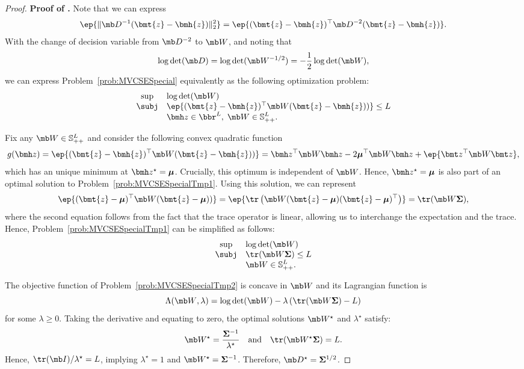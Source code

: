 \documentclass[mnsc, nonblindrev]{informswp}
\newcommand{\1}[1]{\mathds{1}{\left(#1\right)}}
\begin{document}
\begin{appendices}
\begin{proof}{\bf Proof of .}
Note that we can express 
$$
\ep{\|\mb D^{-1}(\bmt{z} - \bmh{z})\|^2_2} = \ep{(\bmt{z} - \bmh{z})^\top{\mb D}^{-2}(\bmt{z} - \bmh{z})}.
$$
With the change of decision variable from $\mb D^{-2}$ to ${\mb W}$, and noting that 
$$
\log \det(\mb D) = \log \det({\mb W^{-1/2}}) = -\frac{1}{2} \log \det(\mb W),
$$ 
we can express Problem~\eqref{prob:MVCSESpecial} equivalently as the following optimization problem:
\begin{equation}
\label{prob:MVCSESpecialTmp1}
\begin{array}{cll}
\sup & \log\det({\mb W}) \\
\subj & \ep{(\bmt{z} - \bmh{z})^\top{\mb W} (\bmt{z} - \bmh{z}))} \leq L \\
& \bmh z \in \bbr^L, \; \displaystyle{\mb W} \in \mathbb{S}^L_{++}.
\end{array}  
\end{equation}

Fix any ${\mb W} \in \mathbb{S}^L_{++}$ and consider the following convex quadratic function
$$
g(\bmh z) = \ep{ (\bmt{z} - \bmh{z} )^\top {\mb W} (\bmt{z} - \bmh{z} ))} = \bmh z^\top \mb W \bmh z - 2 \bm \mu^\top \mb W \bmh z + \ep{\bmt z^\top \mb W \bmt z},
$$
which has an unique minimum at $\bmh z^\star = \bm \mu$. Crucially, this optimum is independent of $\mb W$. Hence, $\bmh z^\star = \bm \mu$ is also part of an optimal solution to Problem~\eqref{prob:MVCSESpecialTmp1}. Using this solution, we can represent 
$$
\ep{(\bmt{z} - \bm{\mu})^\top {\mb W} (\bmt{z} - \bm{\mu}))} = \ep{\tr\left(  {\mb W} (\bmt{z} - \bm \mu )(\bmt{z} - \bm \mu )^\top\right)} = \tr(\mb W \bm \Sigma), 
$$
where the second equation follows from the fact that the trace operator is linear, allowing us to interchange the expectation and the trace.
Hence, Problem~\eqref{prob:MVCSESpecialTmp1} can be simplified as follows:
\begin{equation}
\label{prob:MVCSESpecialTmp2}
\begin{array}{cll}
\sup & \displaystyle\log\det({\mb W}) \\
\subj & \displaystyle\displaystyle \tr(\mb W \bm \Sigma) \leq L \\
& \displaystyle{\mb W} \in \mathbb{S}^L_{++}.
\end{array}  
\end{equation}

The objective function of Problem~\eqref{prob:MVCSESpecialTmp2} is concave in ${\mb W}$ and its Lagrangian function is
$$
\Lambda({\mb W},\lambda) = \log\det(\mb W) - \lambda \left(\tr( \mb W \bm \Sigma) - L\right)
$$
for some $\lambda \geq 0$. Taking the derivative and equating to zero, the optimal solutions $\mb W^\star$ and $\lambda^\star$ satisfy:
\[
\mb W^\star = \frac{\bm \Sigma^{-1}}{\lambda^\star}
~~~\text{and}~~~
\tr( \mb W^\star \bm \Sigma) = L.
\]
Hence, $\tr(\mb I)/\lambda^\star = L$, implying $\lambda^\star=1$ and $\mb W^\star = \bm \Sigma^{-1}$. Therefore, $\mb D^\star = \bm \Sigma^{1/2}$.
\hfill \Halmos
\end{proof}
\vspace{3mm}


\end{appendices}
\end{document}
